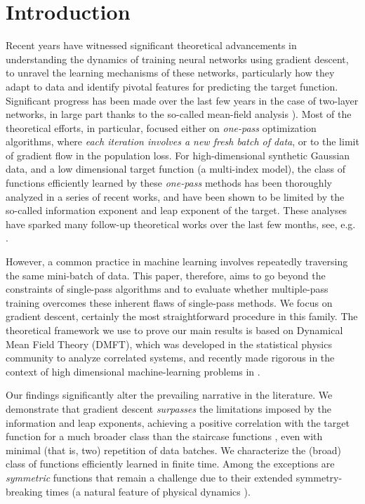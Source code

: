 \section{Introduction}
\label{2402:sec:main:introduction}

Recent years have witnessed significant theoretical advancements in understanding the dynamics of training neural networks using gradient descent, to unravel the learning mechanisms of these networks, particularly how they adapt to data and identify pivotal features for predicting the target function. Significant progress has been made over the last few years in the case of two-layer networks, in large part thanks to the so-called mean-field analysis \citep{mei2018mean,chizat2018global,rotskoff2022trainability,sirignano2020mean}). Most of the theoretical efforts, in particular, focused either on {\it one-pass} optimization algorithms, where {\it each iteration involves a new fresh batch of data}, or to the limit of gradient flow in the population loss. For high-dimensional synthetic Gaussian data, and a low dimensional target function (a multi-index model), the class of functions efficiently learned by these \textit{one-pass} methods has been thoroughly analyzed in a series of recent works, and have been shown to be limited by the so-called information exponent \citep{arous2021online} and leap exponent \citep{abbe2022merged,abbe2023sgd} of the target. These analyses have sparked many follow-up theoretical works over the last few months, see, e.g. \citep{damian2022neural,damian2023smoothing,dandi2023how,bietti2023learning,ba2023learning,moniri2023theory,mousavihosseini2023gradient,zweig2023symmetric}. 


However, a common practice in machine learning involves repeatedly traversing the same mini-batch of data. This paper, therefore, aims to go beyond the constraints of single-pass algorithms and to evaluate whether multiple-pass training overcomes these inherent flaws of single-pass methods. We focus on gradient descent, certainly the most straightforward procedure in this family. The theoretical framework we use to prove our main results is based on Dynamical Mean Field Theory (DMFT), which was developed in the statistical physics community \citep{sompolinsky1988chaos} to analyze correlated systems, and recently made rigorous in the context of high dimensional machine-learning problems in \citep{celentano2021high,gerbelot2022rigorous}.

Our findings significantly alter the prevailing narrative in the literature. We demonstrate that gradient descent {\it surpasses} the limitations imposed by the information and leap exponents, achieving a positive correlation with the target function for a much broader class than the staircase functions \citep{abbe2021staircase}, even with minimal (that is, two) repetition of data batches. We characterize the (broad) class of functions efficiently learned in finite time. Among the exceptions are {\it symmetric} functions that remain a challenge due to their extended symmetry-breaking times (a natural feature of physical dynamics \citep{bouchaud1998out}). 

